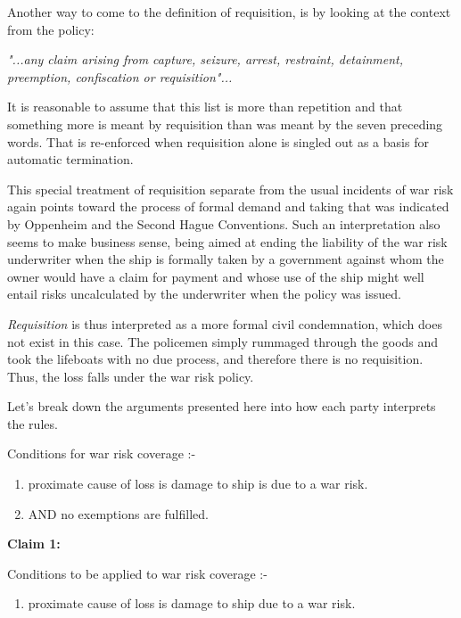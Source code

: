      Another way to come to the definition of requisition, is by looking at the context from the policy:
     
     \textit{ "...any claim arising from capture, seizure, arrest, restraint, detainment, preemption, confiscation or requisition"...}
     
     It is reasonable to assume that this list is more than repetition and that something more is meant by requisition than was meant by the seven preceding words. That is re-enforced when requisition alone is singled out as a basis for automatic termination.
     
     This special treatment of requisition separate from the usual incidents of war risk again points toward the process of formal demand and taking that was indicated by Oppenheim and the Second Hague Conventions. Such an interpretation also seems to make business sense, being aimed at ending the liability of the war risk underwriter when the ship is formally taken by a government against whom the owner would have a claim for payment and whose use of the ship might well entail risks uncalculated by the underwriter when the policy was issued.
     
     \textit{Requisition} is thus interpreted as a more formal civil condemnation, which does not exist in this case. The policemen simply rummaged through the goods and took the lifeboats with no due process, and therefore there is no requisition. Thus, the loss falls under the war risk policy.
     
     \newpage
     
     Let's break down the arguments presented here into how each party interprets the rules.
     \newcommand{\forceindent}{\parindent=1em\indent\parindent=0pt\relax}
     
     Conditions for war risk coverage :-
     
     \begin{enumerate}
        \item  proximate cause of loss is damage to ship is due to a war risk.
        \item  AND no exemptions are fulfilled.
     \end{enumerate}
     
     \textbf{Claim 1:}
     
     Conditions to be applied to war risk coverage :-
     
     \begin{enumerate}
         \item proximate cause of loss is damage to ship due to a war risk.
     \end{enumerate}
                
